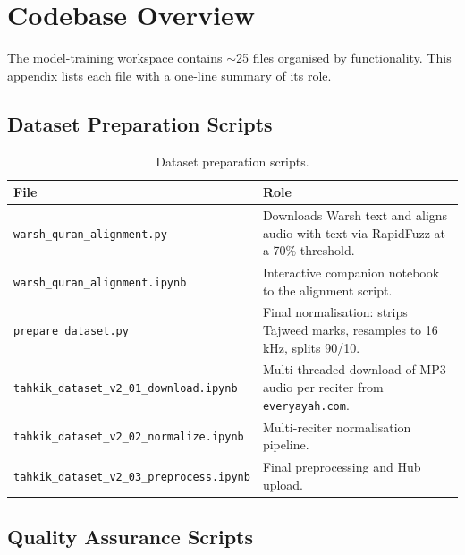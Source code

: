 \chapter{Codebase Overview}
\label{app:mt_codebase}

The model-training workspace contains $\sim$25 files organised by
functionality. This appendix lists each file with a one-line summary of
its role.

\section{Dataset Preparation Scripts}

\begin{table}[H]
  \centering
  \caption{Dataset preparation scripts.}
  \label{tab:mt_app_dataset}
  \renewcommand{\arraystretch}{1.3}
  \begin{tabular}{lp{8cm}}
    \toprule
    \textbf{File} & \textbf{Role} \\
    \midrule
    \texttt{warsh\_quran\_alignment.py}                & Downloads Warsh text and aligns audio with text via RapidFuzz at a 70\% threshold. \\
    \texttt{warsh\_quran\_alignment.ipynb}             & Interactive companion notebook to the alignment script. \\
    \texttt{prepare\_dataset.py}                       & Final normalisation: strips Tajweed marks, resamples to 16\,kHz, splits 90/10. \\
    \texttt{tahkik\_dataset\_v2\_01\_download.ipynb}   & Multi-threaded download of MP3 audio per reciter from \texttt{everyayah.com}. \\
    \texttt{tahkik\_dataset\_v2\_02\_normalize.ipynb}  & Multi-reciter normalisation pipeline. \\
    \texttt{tahkik\_dataset\_v2\_03\_preprocess.ipynb} & Final preprocessing and Hub upload. \\
    \bottomrule
  \end{tabular}
\end{table}

\section{Quality Assurance Scripts}

